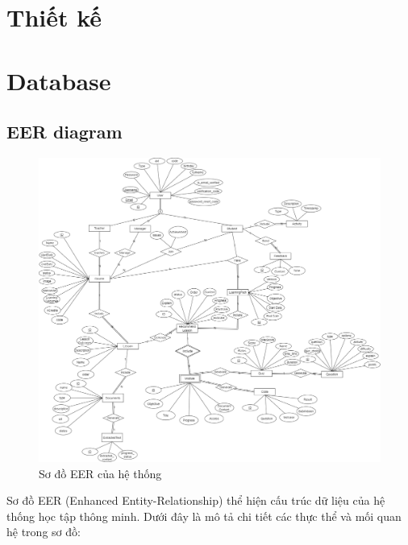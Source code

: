 \section{Thiết kế}

\newpage
\section{Database}
\subsection{EER diagram}

\begin{figure}[h!]
    \centering
    \includegraphics[width=\linewidth]{Images/Anh/EER.png}
    \caption{Sơ đồ EER của hệ thống}
    \label{fig}
\end{figure}
Sơ đồ EER (Enhanced Entity-Relationship) thể hiện cấu trúc dữ liệu của hệ thống học tập thông minh. Dưới đây là mô tả chi tiết các thực thể và mối quan hệ trong sơ đồ:
